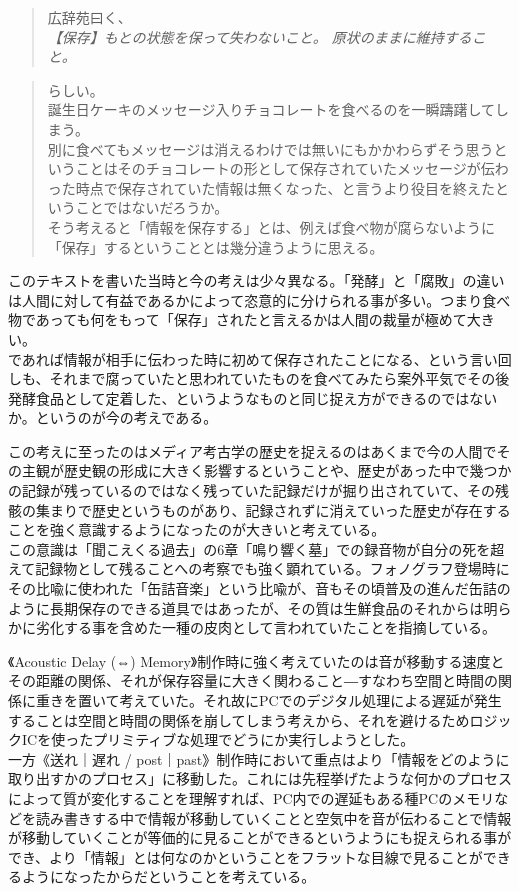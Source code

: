 \documentclass[a4paper,report]{jsbook}
\begin{document}
\begin{quote}
広辞苑曰く、\\
\emph{【保存】もとの状態を保って失わないこと。
原状のままに維持すること。}
\end{quote}

\begin{quote}
らしい。\\
誕生日ケーキのメッセージ入りチョコレートを食べるのを一瞬躊躇してしまう。\\
別に食べてもメッセージは消えるわけでは無いにもかかわらずそう思うということはそのチョコレートの形として保存されていたメッセージが伝わった時点で保存されていた情報は無くなった、と言うより役目を終えたということではないだろうか。\\
そう考えると「情報を保存する」とは、例えば食べ物が腐らないように「保存」するということとは幾分違うように思える。
\end{quote}

このテキストを書いた当時と今の考えは少々異なる。「発酵」と「腐敗」の違いは人間に対して有益であるかによって恣意的に分けられる事が多い。つまり食べ物であっても何をもって「保存」されたと言えるかは人間の裁量が極めて大きい。\\
であれば情報が相手に伝わった時に初めて保存されたことになる、という言い回しも、それまで腐っていたと思われていたものを食べてみたら案外平気でその後発酵食品として定着した、というようなものと同じ捉え方ができるのではないか。というのが今の考えである。

この考えに至ったのはメディア考古学の歴史を捉えるのはあくまで今の人間でその主観が歴史観の形成に大きく影響するということや、歴史があった中で幾つかの記録が残っているのではなく残っていた記録だけが掘り出されていて、その残骸の集まりで歴史というものがあり、記録されずに消えていった歴史が存在することを強く意識するようになったのが大きいと考えている。\\
この意識は「聞こえくる過去」の6章「鳴り響く墓」での録音物が自分の死を超えて記録物として残ることへの考察でも強く顕れている。フォノグラフ登場時にその比喩に使われた「缶詰音楽」という比喩が、音もその頃普及の進んだ缶詰のように長期保存のできる道具ではあったが、その質は生鮮食品のそれからは明らかに劣化する事を含めた一種の皮肉として言われていたことを指摘している。

《Acoustic Delay (⇔)
Memory》制作時に強く考えていたのは音が移動する速度とその距離の関係、それが保存容量に大きく関わること―すなわち空間と時間の関係に重きを置いて考えていた。それ故にPCでのデジタル処理による遅延が発生することは空間と時間の関係を崩してしまう考えから、それを避けるためロジックICを使ったプリミティブな処理でどうにか実行しようとした。\\
一方《送れ｜遅れ /
post｜past》制作時において重点はより「情報をどのように取り出すかのプロセス」に移動した。これには先程挙げたような何かのプロセスによって質が変化することを理解すれば、PC内での遅延もある種PCのメモリなどを読み書きする中で情報が移動していくことと空気中を音が伝わることで情報が移動していくことが等価的に見ることができるというようにも捉えられる事ができ、より「情報」とは何なのかということをフラットな目線で見ることができるようになったからだということを考えている。
\end{document}
